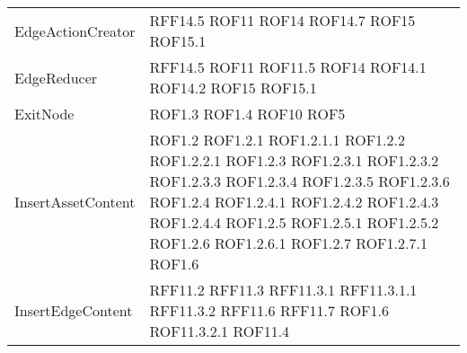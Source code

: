 \begin{longtable}{p{5cm}!{\VRule[1pt]}p{2.5cm}}
	EdgeActionCreator & RFF14.5 \newline ROF11 \newline ROF14 \newline ROF14.7 \newline ROF15 \newline ROF15.1\\
	EdgeReducer & RFF14.5 \newline ROF11 \newline ROF11.5 \newline ROF14 \newline ROF14.1 \newline ROF14.2 \newline ROF15 \newline ROF15.1\\
	ExitNode & ROF1.3 \newline ROF1.4 \newline ROF10 \newline ROF5\\
	InsertAssetContent & ROF1.2 \newline ROF1.2.1 \newline ROF1.2.1.1 \newline ROF1.2.2 \newline ROF1.2.2.1 \newline ROF1.2.3 \newline ROF1.2.3.1 \newline ROF1.2.3.2 \newline ROF1.2.3.3 \newline ROF1.2.3.4 \newline ROF1.2.3.5 \newline ROF1.2.3.6 \newline ROF1.2.4 \newline ROF1.2.4.1 \newline ROF1.2.4.2 \newline ROF1.2.4.3 \newline ROF1.2.4.4 \newline ROF1.2.5 \newline ROF1.2.5.1 \newline ROF1.2.5.2 \newline ROF1.2.6 \newline ROF1.2.6.1 \newline ROF1.2.7 \newline ROF1.2.7.1 \newline ROF1.6\\
	InsertEdgeContent & RFF11.2 \newline RFF11.3 \newline RFF11.3.1 \newline RFF11.3.1.1 \newline RFF11.3.2 \newline RFF11.6 \newline RFF11.7 \newline ROF1.6 \newline ROF11.3.2.1 \newline ROF11.4\\

\end{longtable}
